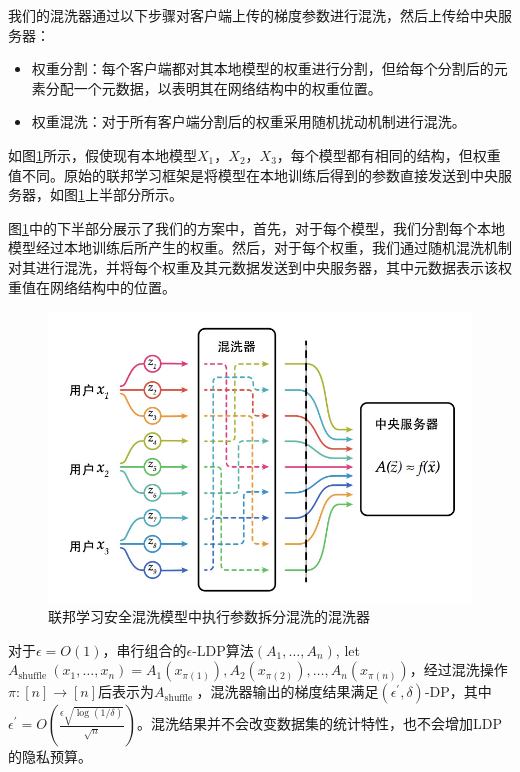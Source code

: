 我们的混洗器通过以下步骤对客户端上传的梯度参数进行混洗，然后上传给中央服务器：
\begin{itemize}
	\item 权重分割：每个客户端都对其本地模型的权重进行分割，但给每个分割后的元素分配一个元数据，以表明其在网络结构中的权重位置。
	\item 权重混洗：对于所有客户端分割后的权重采用随机扰动机制进行混洗。
\end{itemize}

如图\ref{fig:联邦学习安全混洗模型中执行参数拆分混洗的混洗器}所示，假使现有本地模型$X_{1}$，$X_{2}$，$X_{3}$，每个模型都有相同的结构，但权重值不同。原始的联邦学习框架是将模型在本地训练后得到的参数直接发送到中央服务器，如图\ref{fig:联邦学习安全混洗模型中执行参数拆分混洗的混洗器}上半部分所示。

图\ref{fig:联邦学习安全混洗模型中执行参数拆分混洗的混洗器}中的下半部分展示了我们的方案中，首先，对于每个模型，我们分割每个本地模型经过本地训练后所产生的权重。然后，对于每个权重，我们通过随机混洗机制对其进行混洗，并将每个权重及其元数据发送到中央服务器，其中元数据表示该权重值在网络结构中的位置。

\begin{figure}[!hbt]
\centering
	\includegraphics[scale=0.6]{fig2/C4/拆分混洗}%
	\caption{联邦学习安全混洗模型中执行参数拆分混洗的混洗器}
	\label{fig:联邦学习安全混洗模型中执行参数拆分混洗的混洗器}	
\end{figure}

对于$\epsilon=O(1)$，串行组合的$\epsilon$-LDP算法$\left(A_{1}, \ldots, A_{n}\right)$, let $A_{\text {shuffle }}\left(x_{1}, \ldots, x_{n}\right)=A_{1}\left(x_{\pi(1)}\right), A_{2}\left(x_{\pi(2)}\right), \ldots, A_{n}\left(x_{\pi(n)}\right)$，经过混洗操作$\pi:[n] \rightarrow[n]$后表示为$A_{\text {shuffle }}$，混洗器输出的梯度结果满足$\left(\epsilon^{\prime}, \delta\right)$-DP，其中$\epsilon^{\prime}=O\left(\frac{\epsilon \sqrt{\log (1 / \delta)}}{\sqrt{n}}\right)$。混洗结果并不会改变数据集的统计特性，也不会增加LDP的隐私预算。

